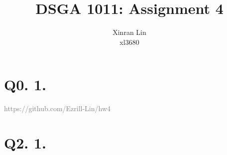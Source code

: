 \documentclass{article}
\title{DSGA 1011: Assignment 4}
\author{Xinran Lin \\ xl3680}
\date{}
\begin{document}
\maketitle
\section*{Q0. 1.}
\textcolor{gray}{https://github.com/Ezrill-Lin/hw4}
\section*{Q2. 1.}
\end{document}
